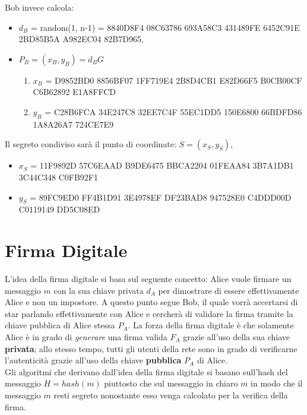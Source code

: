 \documentclass[a4paper,12pt]{tesiinfo}
\begin{document}
Bob invece calcola:
\begin{itemize}
\item $d_B$ = random(1, n-1) = 8840D8F4 08C63786 693A58C3 431489FE 6452C91E 2BD85B5A A982EC04 82B7D965,

\item $P_B = (x_B, y_B) = d_BG$

\begin{enumerate}
\item $x_B$ = D9852BD0 8856BF07 1FF719E4 2B8D4CB1 E82D66F5 B0CB00CF C6B62892 E1A8FFCD

\item $y_B$ = C28B6FCA 34E247C8 32EE7C4F 55EC1DD5 150E6800 66BDFD86 1A8A26A7 724CE7E9
\end{enumerate}
\end{itemize}
Il segreto condiviso sar\`a il punto di coordinate: $S = (x_S, y_S)$,
\begin{itemize}
    \item $x_S$ = 11F9892D 57C6EAAD B9DE6475 BBCA2204 01FEAA84 3B7A1DB1 3C44C348 C0FB92F1
    \item $y_S$ = 89FC9ED0 FF4B1D91 3E4978EF DF23BAD8 947528E0 C4DDD00D C0119149 DD5C08ED
\end{itemize}
%
%
%
%
%
%
%
%
%
%
%
\section{Firma Digitale}
L'idea della firma digitale si basa sul seguente concetto: Alice vuole firmare un messaggio $m$ con la sua chiave privata $d_A$ per dimostrare di essere effettivamente Alice e non un impostore. A questo punto segue Bob, il quale vorr\`a accertarsi di star parlando effettivamente con Alice e cercher\`a di validare la firma tramite la chiave pubblica di Alice stessa $P_A$. La forza della firma digitale \`e che solamente Alice \`e in grado di \textit{generare} una firma valida $F_A$ grazie all'uso della sua chiave \textbf{privata}; allo stesso tempo, tutti gli utenti della rete sono in grado di verificarne l'autenticit\`a grazie all'uso della chiave \textbf{pubblica} $P_A$ di Alice.
\\
Gli algoritmi che derivano dall'idea della firma digitale si basano sull'hash del messaggio $H = hash(m)$ piuttosto che sul messaggio in chiaro $m$ in modo che il messaggio $m$ resti segreto nonostante esso venga calcolato per la verifica della firma.
%
%
%
%
%
%
%
%
%
%
\end{document}
